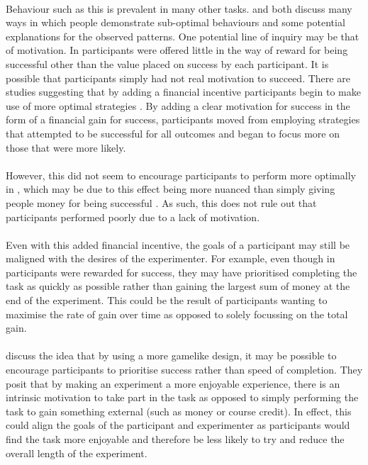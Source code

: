 \documentclass[12pt]{article}
\begin{document}
\paragraph{} Behaviour such as this is prevalent in many other tasks. \cite{KahnemanChoicesValuseFrames} and \cite{Gigerenzer2011} both discuss many ways in which people demonstrate sub-optimal behaviours and some potential explanations for the observed patterns. One potential line of inquiry may be that of motivation. In \cite{clarke2015failure} participants were offered little in the way of reward for being successful other than the value placed on success by each participant. It is possible that participants simply had not real motivation to succeed. There are studies suggesting that by adding a financial incentive participants begin to make use of more optimal strategies \citep{Goodnow1955,phillips1966conservatism}. By adding a clear motivation for success in the form of a financial gain for success, participants moved from employing strategies that attempted to be successful for all outcomes and began to focus more on those that were more likely.

\paragraph{} However, this did not seem to encourage participants to perform more optimally in \cite{morvan2012human}, which may be due to this effect being more nuanced than simply giving people money for being successful \citep{Camerer1999}. As such, this does not rule out that participants performed poorly due to a lack of motivation. 

\paragraph{} Even with this added financial incentive, the goals of a participant may still be maligned with the desires of the experimenter. For example, even though in \cite{morvan2012human} participants were rewarded for success, they may have prioritised completing the task as quickly as possible rather than gaining the largest sum of money at the end of the experiment. This could be the result of participants wanting to maximise the rate of gain over time as opposed to solely focussing on the total gain.

\paragraph{} \cite{miranda2014intrinsic} discuss the idea that by using a more gamelike design, it may be possible to encourage participants to prioritise success rather than speed of completion. They posit that by making an experiment a more enjoyable experience, there is an intrinsic motivation to take part in the task as opposed to simply performing the task to gain something external (such as money or course credit). In effect, this could align the goals of the participant and experimenter as participants would find the task more enjoyable and therefore be less likely to try and reduce the overall length of the experiment. %
\end{document}

